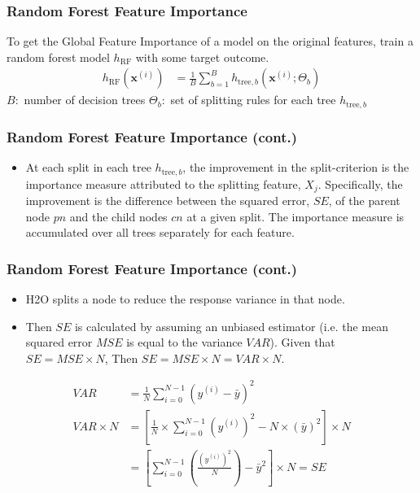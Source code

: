 \begin{frame}\frametitle{Random Forest Feature Importance }
To get the Global Feature Importance of a model on the original features, train a random forest model $h_{\text{RF}}$ with some target outcome.
		\begin{equation}
                            \begin{aligned}\label{eq:rf}
                            h_{\text{RF}}(\mathbf{x}^{(i)}) &= \frac{1}{B}\sum_{b=1}^B h_{\text{tree},b}\left(\mathbf{x}^{(i)}; \Theta_b\right)
                            \end{aligned}
		\end{equation}
		$B:$ number of decision trees \newline
		 $\Theta_b:$ set of splitting rules for each tree $h_{\text{tree},b}$  \newline
\end{frame}


\begin{frame}\frametitle{Random Forest Feature Importance (cont.)}         
	\begin{itemize}
	\item At each split in each tree $h_{\text{tree},b}$, the improvement in the split-criterion is the importance measure attributed to the splitting feature, $X_{j}$. Specifically, the improvement is the difference between the squared error, $SE$, of the parent node $pn$ and the child nodes $cn$ at a given split. The importance measure is accumulated over all trees separately for each feature.
		\end{itemize}
\end{frame}


\begin{frame}\frametitle{Random Forest Feature Importance (cont.)}         
	\begin{itemize}
	\item H2O splits a node to reduce the response variance in that node. 
	\item Then $SE$ is calculated by assuming an unbiased estimator (i.e. the mean squared error $MSE$ is equal to the variance $VAR$). Given that $SE=MSE\times{N}$, Then $SE=MSE\times{N}=VAR\times{N}$.
		\end{itemize}
		\begin{equation}
		 \begin{aligned}\label{eq:rf1}
                           VAR&=\frac{1}{N}\sum_{i=0}^{N-1}(y^{(i)}-\bar{y})^2\\
                           VAR\times{N}&=\left[\frac{1}{N}\times  \sum_{i=0}^{N-1}(y^{(i)})^2 -N\times{(\bar{y})^2} \right] \times N\\
                           &= \left[ \sum_{i=0}^{N-1}(\frac{(y^{(i)})^2}{N}) - \bar{y}^2 \right ]\times N=SE\\        
                 \end{aligned}
		\end{equation}     
\end{frame}


